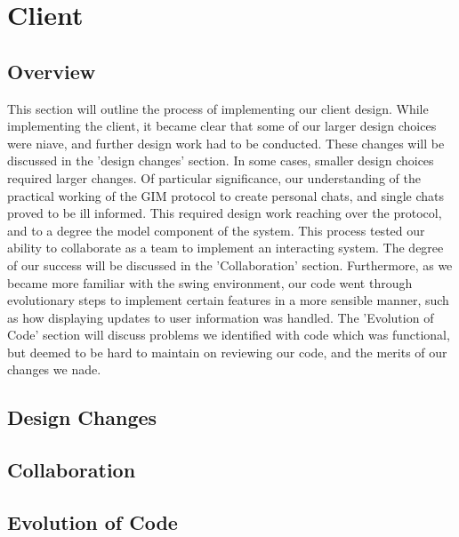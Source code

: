 \section{Client}

\subsection{Overview}

This section will outline the process of implementing our client design. While implementing the client, it became clear that some of our larger design choices were niave, and further design work had to be conducted. These changes will be discussed in the 'design changes' section. In some cases, smaller design choices required larger changes. Of particular significance, our understanding of the practical working of the GIM protocol to create personal chats, and single chats proved to be ill informed. This required design work reaching over the protocol, and to a degree the model component of the system. This process tested our ability to collaborate as a team to implement an interacting system. The degree of our success will be discussed in the 'Collaboration' section. Furthermore, as we became more familiar with the swing environment, our code went through evolutionary steps to implement certain features in a more sensible manner, such as how displaying updates to user information was handled. The 'Evolution of Code' section will discuss problems we identified with code which was functional, but deemed to be hard to maintain on reviewing our code, and the merits of our changes we nade. 

\subsection{Design Changes}

\subsection{Collaboration}

\subsection{Evolution of Code}
